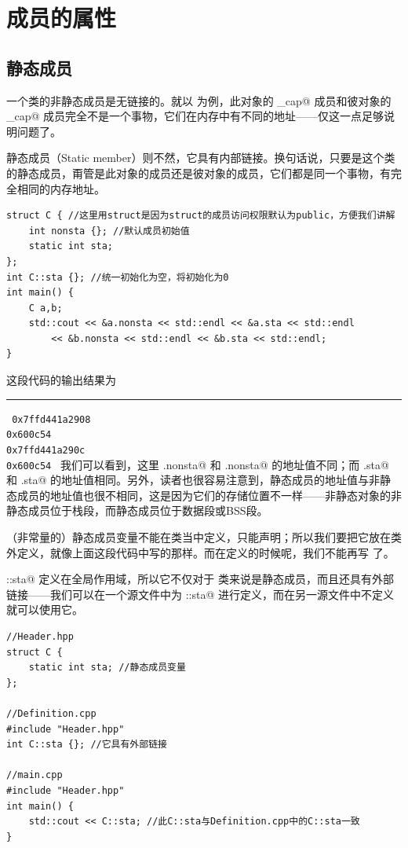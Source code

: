 \section{成员的属性}
\subsection*{静态成员}
一个类的非静态成员是无链接的。就以 \lstinline@valarri@ 为例，此对象的 \lstinline@_cap@ 成员和彼对象的 \lstinline@_cap@ 成员完全不是一个事物，它们在内存中有不同的地址——仅这一点足够说明问题了。\par
静态成员（Static member）则不然，它具有内部链接。换句话说，只要是这个类的静态成员，甭管是此对象的成员还是彼对象的成员，它们都是同一个事物，有完全相同的内存地址。
\begin{lstlisting}
struct C { //这里用struct是因为struct的成员访问权限默认为public，方便我们讲解
    int nonsta {}; //默认成员初始值
    static int sta;
};
int C::sta {}; //统一初始化为空，将初始化为0
int main() {
    C a,b;
    std::cout << &a.nonsta << std::endl << &a.sta << std::endl
        << &b.nonsta << std::endl << &b.sta << std::endl;
}
\end{lstlisting}
这段代码的输出结果为\\\noindent\rule{\linewidth}{.2pt}\texttt{
0x7ffd441a2908\\
0x600c54\\
0x7ffd441a290c\\
0x600c54
}\pagebreak
我们可以看到，这里 \lstinline@a.nonsta@ 和 \lstinline@b.nonsta@ 的地址值不同；而 \lstinline@a.sta@ 和 \lstinline@b.sta@ 的地址值相同。另外，读者也很容易注意到，静态成员的地址值与非静态成员的地址值也很不相同，这是因为它们的存储位置不一样——非静态对象的非静态成员位于栈段，而静态成员位于数据段或BSS段。\par
（非常量的）静态成员变量不能在类当中定义，只能声明；所以我们要把它放在类外定义，就像上面这段代码中写的那样。而在定义的时候呢，我们不能再写 \lstinline@static@ 了。\par
\lstinline@C::sta@ 定义在全局作用域，所以它不仅对于 \lstinline@C@ 类来说是静态成员，而且还具有外部链接——我们可以在一个源文件中为 \lstinline@C::sta@ 进行定义，而在另一源文件中不定义就可以使用它。
\begin{lstlisting}
//Header.hpp
struct C {
    static int sta; //静态成员变量
};

//Definition.cpp
#include "Header.hpp"
int C::sta {}; //它具有外部链接

//main.cpp
#include "Header.hpp"
int main() {
    std::cout << C::sta; //此C::sta与Definition.cpp中的C::sta一致
}
\end{lstlisting}\par
